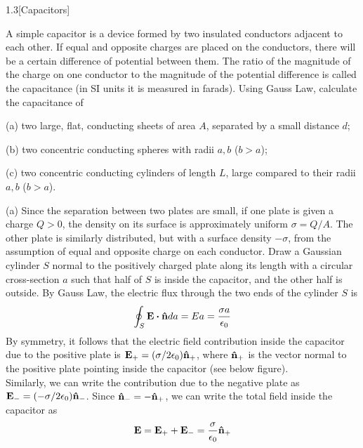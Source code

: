 \documentclass[12pt]{article}
\begin{document}
\begin{problem}{1.3}[Capacitors]

A simple capacitor is a device formed by two insulated conductors adjacent to
each other. If equal and opposite charges are placed on the conductors, there
will be a certain difference of potential between them. The ratio of the
magnitude of the charge on one conductor to the magnitude of the potential
difference is called the capacitance (in SI units it is measured in farads).
Using Gauss Law, calculate the capacitance of

(a) two large, flat, conducting sheets of area $A$, separated by a small
distance $d$;

(b) two concentric conducting spheres with radii $a,b$ ($b>a$);

(c) two concentric conducting cylinders of length $L$, large compared to their
radii $a,b$ ($b>a$).

\begin{solution}
   
    (a) Since the separation between two plates are small, if one plate is given
    a charge $Q>0$, the density on its surface is approximately uniform
    $\sigma=Q/A$. The other plate is similarly distributed, but with a surface
    density $-\sigma$, from the assumption of equal and opposite charge on each
    conductor. Draw a Gaussian cylinder $S$ normal to the positively charged 
    plate  along its length with a circular cross-section $a$ such that half of 
    $S$ is inside the capacitor, and the other half is outside. By Gauss Law, 
    the electric flux through the two ends of the cylinder $S$ is
    \begin{equation}
        \oint_S\vb{E}\vdot\nhat da=Ea=\frac{\sigma a}{\epsilon_0}
    \end{equation}
    By symmetry, it follows that the electric field contribution inside the 
    capacitor due to the positive plate is
    $\vb{E}_+=(\sigma/2\epsilon_0)\vb{\hat{n}}_+$, where $\vb{\hat{n}}_+$
    is the vector normal to the positive plate pointing inside the capacitor
    (see below figure). \\[2in]

    Similarly, we can write the contribution due to the negative plate as
    $\vb{E}_-=(-\sigma/2\epsilon_0)\vb{\hat{n}}_-$. Since $\vb{\hat{n}}_-=-\vb{\hat{n}}_+$, we can
    write the total field inside the capacitor as
    \begin{equation}
        \vb{E}=\vb{E}_++\vb{E}_-=\frac{\sigma}{\epsilon_0}\vb{\hat{n}}_+ 
    \end{equation}
    

\end{solution}
\end{problem}
\end{document}
